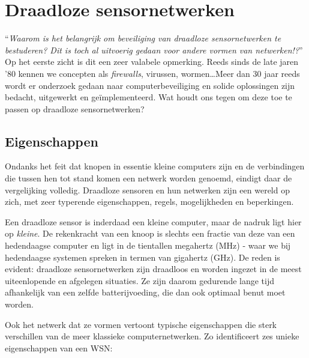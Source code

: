 
\section{Draadloze sensornetwerken}
\label{section:landscape}

``\emph{Waarom is het belangrijk om beveiliging van draadloze sensornetwerken
te bestuderen? Dit is toch al uitvoerig gedaan voor andere vormen van
netwerken!?}'' Op het eerste zicht is dit een zeer valabele opmerking. Reeds
sinds de late jaren '80 kennen we concepten als \emph{firewalls}, virussen,
wormen\dots Meer dan 30 jaar reeds wordt er onderzoek gedaan naar
computerbeveiliging en solide oplossingen zijn bedacht, uitgewerkt en
ge\"implementeerd. Wat houdt ons tegen om deze toe te passen op draadloze
sensornetwerken?

\subsection{Eigenschappen}

Ondanks het feit dat knopen in essentie kleine computers zijn en de
verbindingen die tussen hen tot stand komen een netwerk worden genoemd, eindigt
daar de vergelijking volledig. Draadloze sensoren en hun netwerken zijn een
wereld op zich, met zeer typerende eigenschappen, regels, mogelijkheden en
beperkingen.

Een draadloze sensor is inderdaad een kleine computer, maar de nadruk ligt hier
op \emph{kleine}. De rekenkracht van een knoop is slechts een fractie van deze
van een hedendaagse computer en ligt in de tientallen megahertz (MHz) - waar we
bij hedendaagse systemen spreken in termen van gigahertz (GHz). De reden is
evident: draadloze sensornetwerken zijn draadloos en worden ingezet in de meest
uiteenlopende en afgelegen situaties. Ze zijn daarom gedurende lange tijd
afhankelijk van een zelfde batterijvoeding, die dan ook optimaal benut moet
worden.

Ook het netwerk dat ze vormen vertoont typische eigenschappen die sterk
verschillen van de meer klassieke computernetwerken. Zo identificeert
\citep{blilat2012wireless} zes unieke eigenschappen van een WSN:

